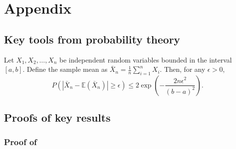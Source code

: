 
\chapter{Appendix}\label{ch:appendix}

\section{Key tools from probability theory}

\label{sec:hoeffding}

\begin{theorem}
Let $X_1, X_2, \ldots, X_n$ be independent random variables bounded in the interval $[a, b]$. Define the sample mean as $\bar{X}_n = \frac{1}{n}\sum_{i=1}^{n} X_i$. Then, for any $\epsilon > 0$, 
$$P\left(\left|\bar{X}_n - \mathbb{E}(\bar{X}_n)\right| \geq \epsilon\right) \leq 2 \exp\left(-\frac{2n\epsilon^2}{(b - a)^2}\right).$$
\end{theorem}

\section{Proofs of key results}

\subsection{Proof of }
\label{app:proof_theorem_a}


